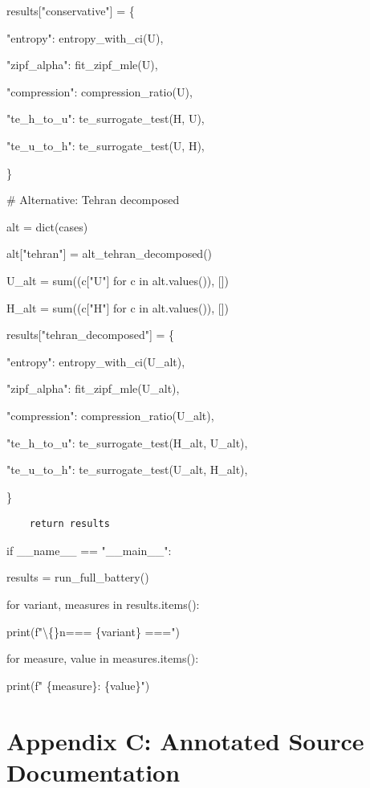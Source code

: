 \documentclass[11pt,letterpaper]{article}
\begin{document}
    results["conservative"] = \{


        "entropy": entropy\_with\_ci(U),


        "zipf\_alpha": fit\_zipf\_mle(U),


        "compression": compression\_ratio(U),


        "te\_h\_to\_u": te\_surrogate\_test(H, U),


        "te\_u\_to\_h": te\_surrogate\_test(U, H),


    \}


    \# Alternative: Tehran decomposed


    alt = dict(cases)


    alt["tehran"] = alt\_tehran\_decomposed()


    U\_alt = sum((c["U"] for c in alt.values()), [])


    H\_alt = sum((c["H"] for c in alt.values()), [])


    results["tehran\_decomposed"] = \{


        "entropy": entropy\_with\_ci(U\_alt),


        "zipf\_alpha": fit\_zipf\_mle(U\_alt),


        "compression": compression\_ratio(U\_alt),


        "te\_h\_to\_u": te\_surrogate\_test(H\_alt, U\_alt),


        "te\_u\_to\_h": te\_surrogate\_test(U\_alt, H\_alt),


    \}

\begin{lstlisting}
    return results
\end{lstlisting}

if \_\_name\_\_ == "\_\_main\_\_":


    results = run\_full\_battery()


    for variant, measures in results.items():


        print(f"\textbackslash\{\}n=== \{variant\} ===")


        for measure, value in measures.items():


            print(f"  \{measure\}: \{value\}")


\newpage
\section*{Appendix C: Annotated Source Documentation}
\end{document}
